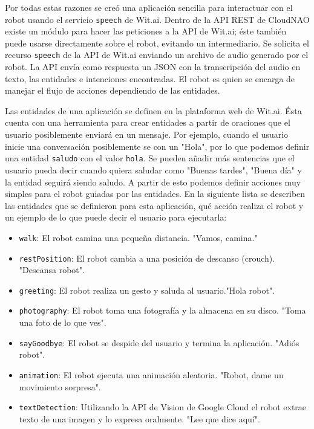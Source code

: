 Por todas estas razones se creó una aplicación sencilla
para interactuar con el robot usando el servicio \texttt{speech} de
Wit.ai.
Dentro de la API REST de CloudNAO existe un módulo para hacer las peticiones
a la API de Wit.ai; éste también puede usarse directamente sobre
el robot, evitando un intermediario.
Se solicita el recurso \texttt{speech} de la API de Wit.ai 
enviando
un archivo de audio generado por el robot. La API
envía como respuesta un JSON con la transcripción del audio 
en texto, las entidades e intenciones encontradas.
El robot es quien se encarga de manejar el flujo de
acciones dependiendo de las entidades.

Las entidades de una aplicación se definen en la plataforma
web de Wit.ai. Ésta cuenta con una herramienta para
crear entidades a partir de oraciones que el usuario
posiblemente enviará en un mensaje. Por ejemplo,
cuando el usuario inicie una conversación posiblemente
se con un "Hola", por lo que podemos definir una
entidad \texttt{saludo} con el valor \texttt{hola}.
Se pueden añadir más sentencias que el usuario
pueda decir cuando quiera saludar como "Buenas tardes",
"Buena día" y la entidad seguirá siendo saludo.
A partir de esto podemos definir acciones muy simples
para el robot guiadas por las entidades. En la
siguiente lista se describen las entidades que se
definieron para esta aplicación, qué acción realiza el robot
y un ejemplo de lo que puede decir el usuario para ejecutarla:


\begin{itemize}
\item  \texttt{walk}: El robot camina una pequeña distancia. "Vamos, camina."
\item \texttt{restPosition}: El robot cambia a una posición de descanso (crouch). "Descansa robot".
\item \texttt{greeting}: El robot realiza un gesto y saluda al usuario."Hola robot".
\item \texttt{photography}: El robot toma una fotografía y la almacena en su disco. "Toma una foto de lo que ves".
\item \texttt{sayGoodbye}: El robot se despide del usuario y termina la aplicación. "Adiós robot".
\item \texttt{animation}: El robot ejecuta una animación aleatoria.
"Robot, dame un movimiento sorpresa".
\item \texttt{textDetection}: Utilizando la API de Vision de Google Cloud
el robot extrae texto de una imagen y lo expresa oralmente. "Lee que dice
aquí".
\end{itemize}

